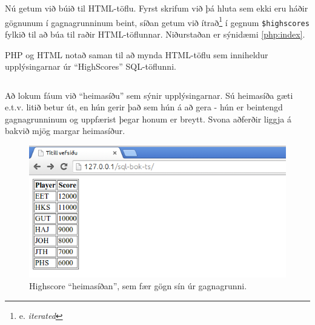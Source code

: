 Nú getum við búið til HTML-töflu. Fyrst skrifum við þá hluta sem ekki eru háðir gögnunum í gagnagrunninum beint, síðan getum við ítrað\footnote{e. \emph{iterated}} í gegnum \verb|$highscores| fylkið til að búa til raðir HTML-töflunnar. Niðurstaðan er sýnidæmi \ref{php:index}.

\begin{example}
\caption[PHP + HTML]{PHP og HTML notað saman til að mynda HTML-töflu sem inniheldur upplýsingarnar úr ``HighScores'' SQL-töflunni.}
\label{php:index}
\centering
\inputminted[frame=lines, fontfamily=courier]{html}{php/index.html.php}
\end{example}

Að lokum fáum við ``heimasíðu'' sem sýnir upplýsingarnar. Sú heimasíða gæti e.t.v. litið betur út, en hún gerir það sem hún á að gera - hún er beintengd gagnagrunninum og uppfærist þegar honum er breytt. Svona aðferðir liggja á bakvið mjög margar heimasíður.

\begin{figure}
\caption[Heimasíðan]{Highscore ``heimasíðan'', sem fær gögn sín úr gagnagrunni.}
\label{mynd:index}
\centering
\includegraphics[width=\linewidth]{myndir/index}
\end{figure}
